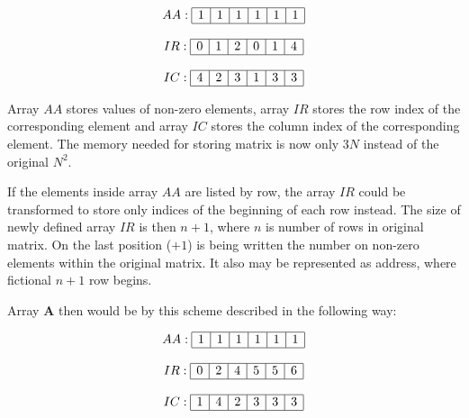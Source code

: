 \documentclass[thesis=M,english]{FITthesis}[2012/10/20]
\begin{document}
$$
\begin{array}{c}
AA:
\begin{array}{|c|c|c|c|c|c|}
 \hline
 1 & 1 & 1 & 1 & 1 & 1 \\
 \hline
\end{array}
\\ \\
IR:
\begin{array}{|c|c|c|c|c|c|}
 \hline
 0 & 1 & 2 & 0 & 1 & 4 \\
 \hline
\end{array}
\\ \\
IC:
\begin{array}{|c|c|c|c|c|c|}
 \hline
 4 & 2 & 3 & 1 & 3 & 3 \\
 \hline
\end{array}
\end{array}
$$

Array $AA$ stores values of non-zero elements, array $IR$ stores the row index of the corresponding element and array $IC$ stores the column index of the corresponding element. The memory needed for storing matrix is now only $3N$ instead of the original $N^2$.

If the elements inside array $AA$ are listed by row, the array $IR$ could be transformed to store only indices of the beginning of each row instead. The size of newly defined array $IR$ is then $n+1$, where $n$ is number of rows in original matrix. On the last position ($+1$) is being written the number on non-zero elements within the original matrix. It also may be represented as address, where fictional $n+1$ row begins. 

Array $\textbf{A}$ then would be by this scheme described in the following way:

$$
\begin{array}{c}
AA:
\begin{array}{|c|c|c|c|c|c|}
 \hline
 1 & 1 & 1 & 1 & 1 & 1 \\
 \hline
\end{array}
\\ \\
IR:
\begin{array}{|c|c|c|c|c|c|}
 \hline
 0 & 2 & 4 & 5 & 5 & 6 \\
 \hline
\end{array}
\\ \\
IC:
\begin{array}{|c|c|c|c|c|c|}
 \hline
 1 & 4 & 2 & 3 & 3 & 3 \\
 \hline
\end{array}
\end{array}
$$
\end{document}

